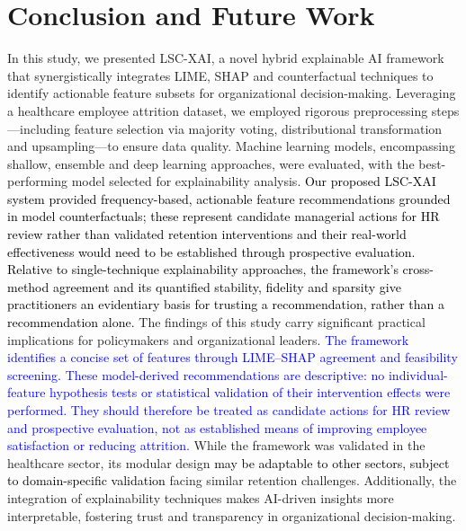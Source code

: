 \documentclass[a4paper,fleqn]{cas-sc}
\begin{document}
{\section{Conclusion and Future Work}
\label{sec:conclusion}
In this study, we presented LSC-XAI, a novel hybrid explainable AI framework that synergistically integrates LIME, SHAP and counterfactual techniques to identify actionable feature subsets for organizational decision-making. Leveraging a healthcare employee attrition dataset, we employed rigorous preprocessing steps—including feature selection via majority voting, distributional transformation and upsampling—to ensure data quality. Machine learning models, encompassing shallow, ensemble and deep learning approaches, were evaluated, with the best-performing model selected for explainability analysis. \textcolor{black}{Our proposed LSC-XAI system provided frequency-based, actionable feature recommendations grounded in model counterfactuals; these represent candidate managerial actions for HR review rather than validated retention interventions and their real-world effectiveness would need to be established through prospective evaluation. Relative to single-technique explainability approaches, the framework's cross-method agreement and its quantified stability, fidelity and sparsity give practitioners an evidentiary basis for trusting a recommendation, rather than a recommendation alone.}
The findings of this study carry significant practical implications for policymakers and organizational leaders. \textcolor{blue}{The framework identifies a concise set of features through LIME--SHAP agreement and feasibility screening. These model-derived recommendations are descriptive: no individual-feature hypothesis tests or statistical validation of their intervention effects were performed. They should therefore be treated as candidate actions for HR review and prospective evaluation, not as established means of improving employee satisfaction or reducing attrition.} While the framework was validated in the healthcare sector, its modular design \textcolor{black}{may be adaptable to other sectors, subject to domain-specific validation} facing similar retention challenges. Additionally, the integration of explainability techniques makes AI-driven insights more interpretable, fostering trust and transparency in organizational decision-making.

}
\end{document}
